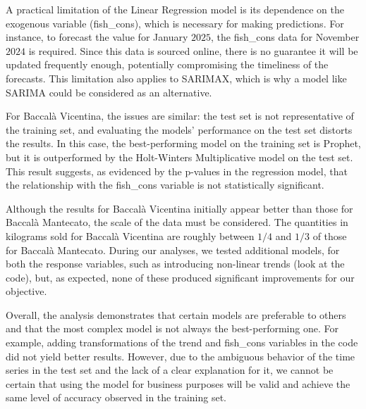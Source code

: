 \documentclass[10pt,twocolumn,letterpaper]{article}
\begin{document}
A practical limitation of the Linear Regression model is its dependence on the exogenous variable (fish\_cons), which is necessary for making predictions. For instance, to forecast the value for January $2025$, the fish\_cons data for November $2024$ is required. Since this data is sourced online, there is no guarantee it will be updated frequently enough, potentially compromising the timeliness of the forecasts. This limitation also applies to SARIMAX, which is why a model like SARIMA could be considered as an alternative.

For Baccalà Vicentina, the issues are similar: the test set is not representative of the training set, and evaluating the models' performance on the test set distorts the results. In this case, the best-performing model on the training set is Prophet, but it is outperformed by the Holt-Winters Multiplicative model on the test set. This result suggests, as evidenced by the p-values in the regression model, that the relationship with the fish\_cons variable is not statistically significant.

Although the results for Baccalà Vicentina initially appear better than those for Baccalà Mantecato, the scale of the data must be considered. The quantities in kilograms sold for Baccalà Vicentina are roughly between $1/4$ and $1/3$ of those for Baccalà Mantecato. During our analyses, we tested additional models, for both the response variables, such as introducing non-linear trends (look at the code), but, as expected, none of these produced significant improvements for our objective.

Overall, the analysis demonstrates that certain models are preferable to others and that the most complex model is not always the best-performing one. For example, adding transformations of the trend and fish\_cons variables in the code did not yield better results. However, due to the ambiguous behavior of the time series in the test set and the lack of a clear explanation for it, we cannot be certain that using the model for business purposes will be valid and achieve the same level of accuracy observed in the training set.
\end{document}
